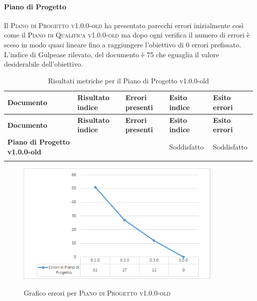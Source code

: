 \documentclass[../piano-di-qualifica.tex]{subfiles}
\begin{document}
\paragraph{Piano di Progetto}
\label{sub:piano_di_progetto}
Il \textsc{Piano di Progetto v1.0.0-old} ha presentato parecchi errori inizialmente così come il \textsc{Piano di Qualifica v1.0.0-old} ma dopo ogni verifica il numero di errori è sceso in modo quasi lineare fino a raggiungere l'obiettivo di 0 errori prefissato.
L'indice di Gulpease rilevato, del documento è 75 che eguaglia il valore desiderabile dell'obiettivo.

\renewcommand{\arraystretch}{2} %
\begin{longtable}[H]{>{\centering\bfseries}m{6cm} >{\centering}m{2cm} >{\centering}m{2.5cm} >{\centering}m{2.5cm} >{\centering\arraybackslash}m{2.5cm}}  
  \rowcolor{lightgray}
  {\textbf{Documento}} & {\textbf{Risultato indice}} & {\textbf{Errori presenti}} & {\textbf{Esito indice}} & {\textbf{Esito errori}}  \\
  \endfirsthead%
  \rowcolor{lightgray}
  {\textbf{Documento}} & {\textbf{Risultato indice}} & {\textbf{Errori presenti}} & {\textbf{Esito indice}} & {\textbf{Esito errori}}  \\
  \endhead%
  \textbf{Piano di Progetto v1.0.0-old} & 75                 & 0               & Soddisfatto & Soddisfatto \\
  \caption{Risultati metriche per il Piano di Progetto v1.0.0-old}
  \label{tab:my-table}
\end{longtable}

\begin{figure}[H]
    \centering
    \includegraphics[width=10cm]{img/erroriPdP.png}
    \label{fig:scice_documenti}
    \caption{Grafico errori per \textsc{Piano di Progetto v1.0.0-old}}
\end{figure}
\end{document}
